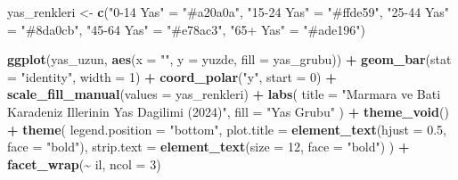 \documentclass[
]{article}
\newenvironment{Shaded}{\begin{snugshade}}{\end{snugshade}}
\newcommand{\AttributeTok}[1]{\textcolor[rgb]{0.13,0.29,0.53}{#1}}
\newcommand{\DecValTok}[1]{\textcolor[rgb]{0.00,0.00,0.81}{#1}}
\newcommand{\FloatTok}[1]{\textcolor[rgb]{0.00,0.00,0.81}{#1}}
\newcommand{\FunctionTok}[1]{\textcolor[rgb]{0.13,0.29,0.53}{\textbf{#1}}}
\newcommand{\NormalTok}[1]{#1}
\newcommand{\OtherTok}[1]{\textcolor[rgb]{0.56,0.35,0.01}{#1}}
\newcommand{\SpecialCharTok}[1]{\textcolor[rgb]{0.81,0.36,0.00}{\textbf{#1}}}
\newcommand{\StringTok}[1]{\textcolor[rgb]{0.31,0.60,0.02}{#1}}
\begin{document}
\begin{Shaded}
\begin{Highlighting}[]
\NormalTok{yas\_renkleri }\OtherTok{\textless{}{-}} \FunctionTok{c}\NormalTok{(}\StringTok{"0{-}14 Yas"} \OtherTok{=} \StringTok{"\#a20a0a"}\NormalTok{, }
                 \StringTok{"15{-}24 Yas"} \OtherTok{=} \StringTok{"\#ffde59"}\NormalTok{, }
                 \StringTok{"25{-}44 Yas"} \OtherTok{=} \StringTok{"\#8da0cb"}\NormalTok{, }
                 \StringTok{"45{-}64 Yas"} \OtherTok{=} \StringTok{"\#e78ac3"}\NormalTok{, }
                 \StringTok{"65+ Yas"} \OtherTok{=} \StringTok{"\#ade196"}\NormalTok{)}


\FunctionTok{ggplot}\NormalTok{(yas\_uzun, }\FunctionTok{aes}\NormalTok{(}\AttributeTok{x =} \StringTok{""}\NormalTok{, }\AttributeTok{y =}\NormalTok{ yuzde, }\AttributeTok{fill =}\NormalTok{ yas\_grubu)) }\SpecialCharTok{+}
  \FunctionTok{geom\_bar}\NormalTok{(}\AttributeTok{stat =} \StringTok{"identity"}\NormalTok{, }\AttributeTok{width =} \DecValTok{1}\NormalTok{) }\SpecialCharTok{+}
  \FunctionTok{coord\_polar}\NormalTok{(}\StringTok{"y"}\NormalTok{, }\AttributeTok{start =} \DecValTok{0}\NormalTok{) }\SpecialCharTok{+}
  \FunctionTok{scale\_fill\_manual}\NormalTok{(}\AttributeTok{values =}\NormalTok{ yas\_renkleri) }\SpecialCharTok{+}
  \FunctionTok{labs}\NormalTok{(}
    \AttributeTok{title =} \StringTok{"Marmara ve Bati Karadeniz Illerinin Yas Dagilimi (2024)"}\NormalTok{,}
    \AttributeTok{fill =} \StringTok{"Yas Grubu"}
\NormalTok{  ) }\SpecialCharTok{+}
  \FunctionTok{theme\_void}\NormalTok{() }\SpecialCharTok{+}
  \FunctionTok{theme}\NormalTok{(}
    \AttributeTok{legend.position =} \StringTok{"bottom"}\NormalTok{,}
    \AttributeTok{plot.title =} \FunctionTok{element\_text}\NormalTok{(}\AttributeTok{hjust =} \FloatTok{0.5}\NormalTok{, }\AttributeTok{face =} \StringTok{"bold"}\NormalTok{),}
    \AttributeTok{strip.text =} \FunctionTok{element\_text}\NormalTok{(}\AttributeTok{size =} \DecValTok{12}\NormalTok{, }\AttributeTok{face =} \StringTok{"bold"}\NormalTok{)}
\NormalTok{  ) }\SpecialCharTok{+}
  \FunctionTok{facet\_wrap}\NormalTok{(}\SpecialCharTok{\textasciitilde{}}\NormalTok{ il, }\AttributeTok{ncol =} \DecValTok{3}\NormalTok{)}
\end{Highlighting}
\end{Shaded}
\end{document}
